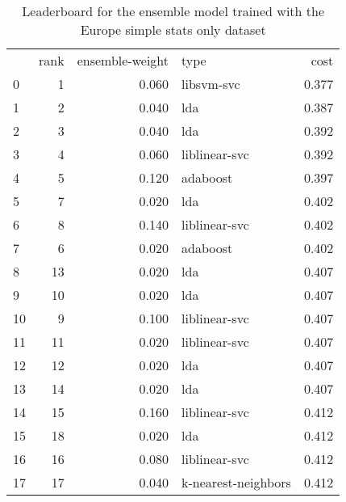 \begin{table}[]
	\centering
	\begin{tabular}{lrrlr}
		   & rank & ensemble-weight & type                & cost  \\
		0  & 1    & 0.060           & libsvm-svc          & 0.377 \\
		1  & 2    & 0.040           & lda                 & 0.387 \\
		2  & 3    & 0.040           & lda                 & 0.392 \\
		3  & 4    & 0.060           & liblinear-svc       & 0.392 \\
		4  & 5    & 0.120           & adaboost            & 0.397 \\
		5  & 7    & 0.020           & lda                 & 0.402 \\
		6  & 8    & 0.140           & liblinear-svc       & 0.402 \\
		7  & 6    & 0.020           & adaboost            & 0.402 \\
		8  & 13   & 0.020           & lda                 & 0.407 \\
		9  & 10   & 0.020           & lda                 & 0.407 \\
		10 & 9    & 0.100           & liblinear-svc       & 0.407 \\
		11 & 11   & 0.020           & liblinear-svc       & 0.407 \\
		12 & 12   & 0.020           & lda                 & 0.407 \\
		13 & 14   & 0.020           & lda                 & 0.407 \\
		14 & 15   & 0.160           & liblinear-svc       & 0.412 \\
		15 & 18   & 0.020           & lda                 & 0.412 \\
		16 & 16   & 0.080           & liblinear-svc       & 0.412 \\
		17 & 17   & 0.040           & k-nearest-neighbors & 0.412 \\
	\end{tabular}

	\caption{Leaderboard for the ensemble model trained with the Europe simple stats only dataset}
	\label{tab:lb-europe-games-stats-only}
\end{table}


